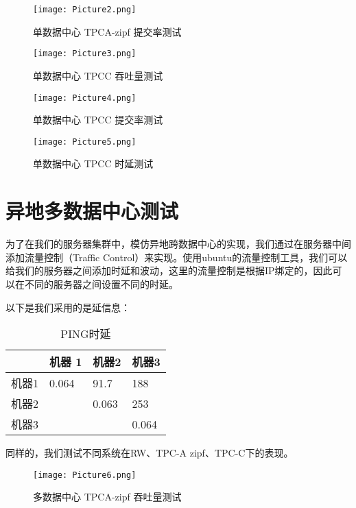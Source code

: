 \begin{figure}[htb]
  \centering
  \texttt{[image: Picture2.png]}
  \caption{单数据中心 TPCA-zipf 提交率测试}
  \label{fig:pic2}
\end{figure}

\begin{figure}[htb]
  \centering
  \texttt{[image: Picture3.png]}
  \caption{单数据中心 TPCC 吞吐量测试}
  \label{fig:pic3}
\end{figure}

\begin{figure}[htb]
  \centering
  \texttt{[image: Picture4.png]}
  \caption{单数据中心 TPCC 提交率测试}
  \label{fig:pic4}
\end{figure}

\begin{figure}[htb]
  \centering
  \texttt{[image: Picture5.png]}
  \caption{单数据中心 TPCC 时延测试}
  \label{fig:pic5}
\end{figure}

\section{异地多数据中心测试}
为了在我们的服务器集群中，模仿异地跨数据中心的实现，我们通过在服务器中间添加流量控制（Traffic Control）来实现。使用ubuntu的流量控制工具，我们可以给我们的服务器之间添加时延和波动，这里的流量控制是根据IP绑定的，因此可以在不同的服务器之间设置不同的时延。

以下是我们采用的是延信息：

\begin{table}[htb]
  \centering\small
  \caption{PING时延}
  \label{tab:ex1}
  \begin{tabular}{p{90pt}p{90pt}p{90pt}p{90pt}}
    \toprule
        & 机器 1&机器2&机器3 \\
    \midrule
    机器1&  0.064&91.7&188 \\
    机器2&  &0.063&253\\
    机器3&  & &0.064  \\

    \bottomrule
  \end{tabular}
\end{table}

同样的，我们测试不同系统在RW、TPC-A zipf、TPC-C下的表现。

\begin{figure}[htb]
  \centering
  \texttt{[image: Picture6.png]}
  \caption{多数据中心 TPCA-zipf 吞吐量测试}
  \label{fig:pic6}
\end{figure}


